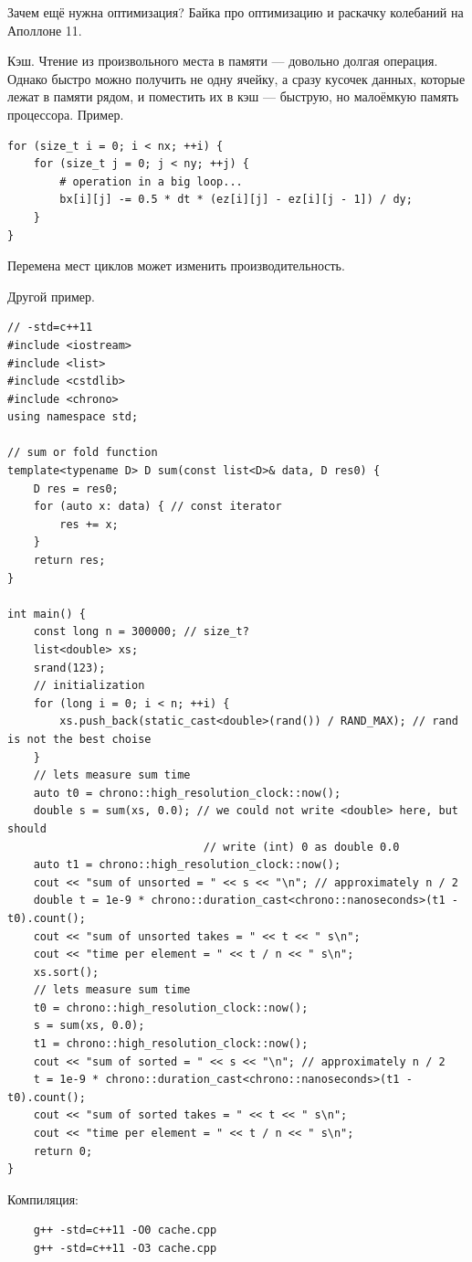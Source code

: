 \documentclass{book}
\begin{document}
Зачем ещё нужна оптимизация? Байка про оптимизацию и раскачку колебаний на Аполлоне 11.

Кэш. Чтение из произвольного места в памяти --- довольно долгая операция. Однако быстро можно
получить не одну ячейку, а сразу кусочек данных, которые лежат в памяти рядом, и поместить их в кэш
--- быструю, но малоёмкую память процессора. Пример.
\begin{verbatim}
for (size_t i = 0; i < nx; ++i) {
    for (size_t j = 0; j < ny; ++j) {
        # operation in a big loop...
        bx[i][j] -= 0.5 * dt * (ez[i][j] - ez[i][j - 1]) / dy;
    }
}
\end{verbatim}
Перемена мест циклов может изменить производительность.

Другой пример.
\begin{verbatim}
// -std=c++11
#include <iostream>
#include <list>
#include <cstdlib>
#include <chrono>
using namespace std;

// sum or fold function
template<typename D> D sum(const list<D>& data, D res0) {
    D res = res0;
    for (auto x: data) { // const iterator
        res += x;
    }
    return res;
}

int main() {
    const long n = 300000; // size_t?
    list<double> xs;
    srand(123);
    // initialization
    for (long i = 0; i < n; ++i) {
        xs.push_back(static_cast<double>(rand()) / RAND_MAX); // rand is not the best choise
    }
    // lets measure sum time
    auto t0 = chrono::high_resolution_clock::now();
    double s = sum(xs, 0.0); // we could not write <double> here, but should
                              // write (int) 0 as double 0.0
    auto t1 = chrono::high_resolution_clock::now();
    cout << "sum of unsorted = " << s << "\n"; // approximately n / 2
    double t = 1e-9 * chrono::duration_cast<chrono::nanoseconds>(t1 - t0).count();
    cout << "sum of unsorted takes = " << t << " s\n";
    cout << "time per element = " << t / n << " s\n";
    xs.sort();
    // lets measure sum time
    t0 = chrono::high_resolution_clock::now();
    s = sum(xs, 0.0);
    t1 = chrono::high_resolution_clock::now();
    cout << "sum of sorted = " << s << "\n"; // approximately n / 2
    t = 1e-9 * chrono::duration_cast<chrono::nanoseconds>(t1 - t0).count();
    cout << "sum of sorted takes = " << t << " s\n";
    cout << "time per element = " << t / n << " s\n";
    return 0;
}
\end{verbatim}
Компиляция:
\begin{verbatim}
    g++ -std=c++11 -O0 cache.cpp
    g++ -std=c++11 -O3 cache.cpp
\end{verbatim}
\end{document}
